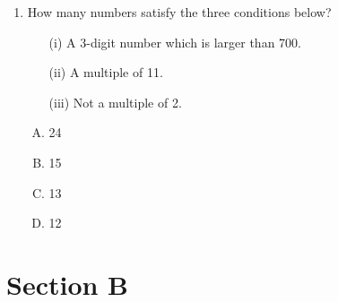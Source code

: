 \documentclass[12pt]{scrartcl}
\begin{document}
\begin{enumerate}[resume]
\item How many numbers satisfy the three conditions below?
\begin{itemize}
    \item[(i)] A 3-digit number which is larger than 700.
    \item[(ii)] A multiple of 11.
    \item[(iii)] Not a multiple of 2.
\end{itemize}
    \begin{multicols}{4}
        \begin{enumerate}[(A)]
            \item 24
            \item 15
            \item 13
            \item 12
        \end{enumerate}
    \end{multicols} \hrulefill
\end{enumerate}

\newpage
\section{Section B}
\end{document}
